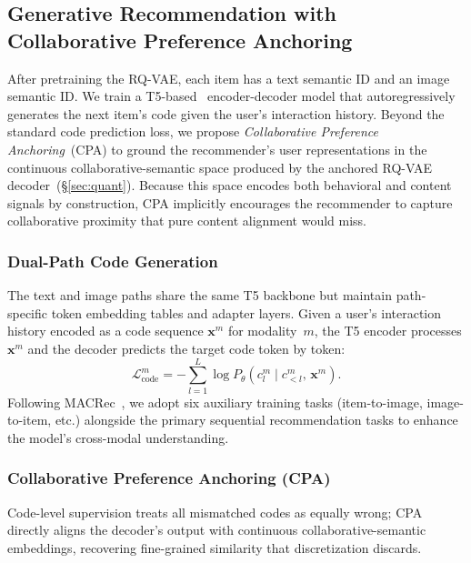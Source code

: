 \documentclass[sigconf, anonymous, review]{acmart}
\begin{document}
\subsection{Generative Recommendation with Collaborative Preference Anchoring}
\label{sec:cpa}

After pretraining the RQ-VAE, each item has a text semantic ID and an image semantic ID.
% 
We train a T5-based~\cite{t5} encoder-decoder model that autoregressively generates the next item's code given the user's interaction history.
%
Beyond the standard code prediction loss, we propose \emph{Collaborative Preference Anchoring}~(CPA) to ground the recommender's user representations in the continuous collaborative-semantic space produced by the anchored RQ-VAE decoder~(\S\ref{sec:quant}).
%
Because this space encodes both behavioral and content signals by construction, CPA implicitly encourages the recommender to capture collaborative proximity that pure content alignment would miss.

\subsubsection{Dual-Path Code Generation}

The text and image paths share the same T5 backbone but maintain path-specific token embedding tables and adapter layers.
% 
Given a user's interaction history encoded as a code sequence $\mathbf{x}^m$ for modality~$m$, the T5 encoder processes $\mathbf{x}^m$ and the decoder predicts the target code token by token:
\begin{equation}
    \mathcal{L}_{\text{code}}^m = -\sum_{l=1}^{L} \log P_\theta(c_l^m \mid c_{<l}^m,\, \mathbf{x}^m).
\end{equation}
%
Following MACRec~\cite{macrec}, we adopt six auxiliary training tasks (item-to-image, image-to-item, etc.) alongside the primary sequential recommendation tasks to enhance the model's cross-modal understanding.

\subsubsection{Collaborative Preference Anchoring (CPA)}
\label{sec:cpa_loss}

Code-level supervision treats all mismatched codes as equally wrong; CPA directly aligns the decoder's output with continuous collaborative-semantic embeddings, recovering fine-grained similarity that discretization discards.
\end{document}
